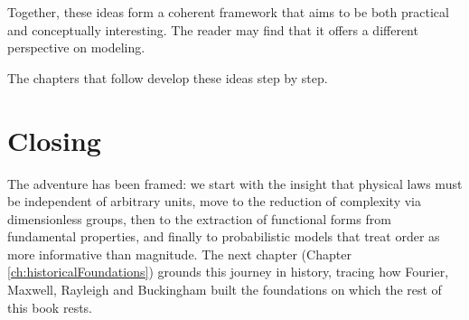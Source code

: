Together, these ideas form a coherent framework that aims to be both practical and conceptually interesting. The reader may find that it offers a different perspective on modeling.

The chapters that follow develop these ideas step by step.

\section*{Closing}
The adventure has been framed: we start with the insight that physical laws must be independent of arbitrary units, move to the reduction of complexity via dimensionless groups, then to the extraction of functional forms from fundamental properties, and finally to probabilistic models that treat order as more informative than magnitude. The next chapter (Chapter \ref{ch:historicalFoundations}) grounds this journey in history, tracing how Fourier, Maxwell, Rayleigh and Buckingham built the foundations on which the rest of this book rests. 